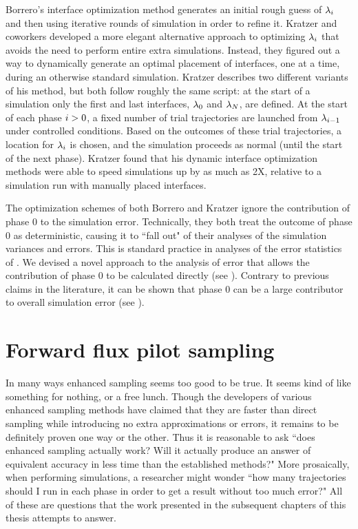 Borrero's interface optimization method generates an initial rough guess of ${\lambda}_{i}$ and then using iterative rounds of  simulation in order to refine it. Kratzer and coworkers developed a more elegant alternative approach\supercite{Kratzer:2013fs} to optimizing ${\lambda}_{i}$ that avoids the need to perform entire extra simulations. Instead, they figured out a way to dynamically generate an optimal placement of interfaces, one at a time, during an otherwise standard  simulation. Kratzer describes two different variants of his method, but both follow roughly the same script: at the start of a simulation only the first and last interfaces, ${\lambda}_{0}$ and ${\lambda}_{N}$, are defined. At the start of each phase $i>0$, a fixed number of trial trajectories are launched from ${\lambda}_{i - 1}$ under controlled conditions. Based on the outcomes of these trial trajectories, a location for ${\lambda}_{i}$ is chosen, and the  simulation proceeds as normal (until the start of the next phase). Kratzer found that his dynamic interface optimization methods were able to speed simulations up by as much as 2X, relative to a simulation run with manually placed interfaces.

The optimization schemes of both Borrero and Kratzer ignore the contribution of phase $0$ to the simulation error. Technically, they both treat the outcome of phase $0$ as deterministic, causing it to ``fall out" of their analyses of the simulation variances and errors. This is standard practice\supercite{Allen:2006ch} in analyses of the error statistics of . We devised a novel approach to the analysis of  error that allows the contribution of phase $0$ to be calculated directly (see ). Contrary to previous claims\supercite{Allen:2009kb} in the literature, it can be shown that phase $0$ can be a large contributor to overall simulation error (see ).

\section{Forward flux pilot sampling}\label{sec:intro_ffpilot}
In many ways enhanced sampling seems too good to be true. It seems kind of like something for nothing, or a free lunch. Though the developers of various enhanced sampling methods have claimed that they are faster than direct sampling while introducing no extra approximations or errors\supercite{Zhang:2010kfa,Allen:2006ch}, it remains to be definitely proven one way or the other. Thus it is reasonable to ask ``does enhanced sampling actually work? Will it actually produce an answer of equivalent accuracy in less time than the established methods?" More prosaically, when performing  simulations, a researcher might wonder ``how many trajectories should I run in each phase in order to get a result without too much error?" All of these are questions that the work presented in the subsequent chapters of this thesis attempts to answer.

